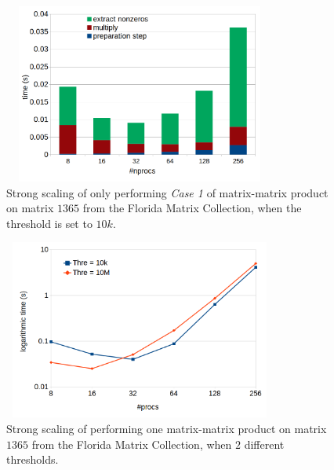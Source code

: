 \begin{figure}[htbp]
    \includegraphics[width=9cm,height=5.9cm]{./figures/strong002.png}
    \caption{Strong scaling of only performing \textit{Case 1} of matrix-matrix product on matrix $1365$ from the Florida Matrix Collection, when the threshold is set to $10k$.}
    \label{fig:strong002}
\end{figure}



\begin{figure}[htbp]
    \includegraphics[width=9cm,height=5.9cm]{./figures/strong003.png}
    \caption{Strong scaling of performing one matrix-matrix product on matrix $1365$ from the Florida Matrix Collection, when $2$ different thresholds.}
    \label{fig:strong003}
\end{figure}
